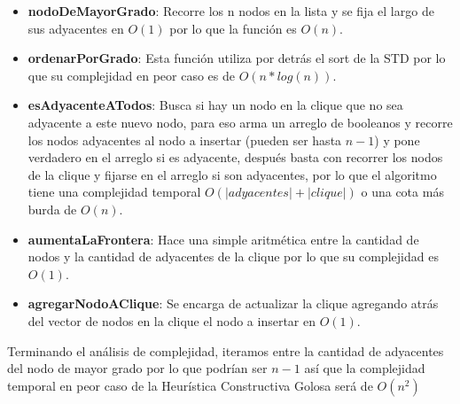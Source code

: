 \begin{itemize}
	 \item \textbf{nodoDeMayorGrado}: Recorre los n nodos en la lista y se fija el largo de sus adyacentes en $O(1)$ por lo que la función es $O(n)$.

	\item \textbf{ordenarPorGrado}: Esta función utiliza por detrás el sort de la STD por lo que su complejidad en peor caso es de $O(n*log(n))$.

\item \textbf{esAdyacenteATodos}: Busca si hay un nodo en la clique que no sea adyacente a este nuevo nodo, para eso arma un arreglo de booleanos y recorre los nodos adyacentes al nodo a insertar (pueden ser hasta $n-1$) y pone verdadero en el arreglo si es adyacente, después basta con recorrer los nodos de la clique y fijarse en el arreglo si son adyacentes, por lo que el algoritmo tiene una complejidad temporal $O(|adyacentes| + |clique|)$ o una cota más burda de $O(n)$.

\item \textbf{aumentaLaFrontera}: Hace una simple aritmética entre la cantidad de nodos y la cantidad de adyacentes de la clique por lo que su complejidad es $O(1)$.

\item \textbf{agregarNodoAClique}: Se encarga de actualizar la clique agregando atrás del vector de nodos en la clique el nodo a insertar en $O(1)$.

\end{itemize}

Terminando el análisis de complejidad, iteramos entre la cantidad de adyacentes del nodo de mayor grado por lo que podrían ser $n-1$ así que la complejidad temporal en peor caso de la Heurística Constructiva Golosa será de $O(n^2)$

